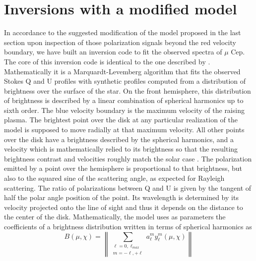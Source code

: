\documentclass{/Users/art2/TeX/aanda/aa}
\begin{document}
\section{Inversions with a modified model}

In accordance to the suggested modification of the model proposed in the last section upon inspection of those polarization signals beyond the red velocity boundary, we have built an inversion code to fit the observed spectra of $\mu$ Cep. The core of this inversion code is identical to the one described by \cite{LA18}. Mathematically it is a Marquardt-Levemberg algorithm that fits the observed Stokes Q and U profiles with synthetic profiles computed from a distribution of brightness over the surface of  the star. On the front hemisphere, this distribution of brightness is described by a linear combination of spherical harmonics up to sixth order. The blue velocity boundary is the maximum velocity of the raising plasma. The brightest point over the disk at any particular realization of the model is supposed to move radially at that maximum velocity. All other points over the disk have a brightness described by the spherical harmonics, and a velocity which is mathematically relied to its brightness so that the resulting brightness contrast and velocities roughly match the solar case \citep[see the Appendix in][]{LA22}. The polarization emitted by a point over the hemisphere is proportional to that brightness, but also to the squared sine of the scattering angle, as expected for Rayleigh scattering. The ratio of polarizations between Q and U is given by the tangent of half the polar angle position of the point. Its wavelength is determined by its velocity projected onto the line of sight and thus it depends on the distance to the center of the disk. Mathematically, the model uses as parameters  the coefficients of  a brightness distribution written in terms of spherical harmonics as
\begin{equation}
B(\mu,\chi)=\left \| \sum_{\substack{\ell=0,\ell_{max} \\ m=-\ell,+\ell}} a_{\ell}^m y_{\ell}^m(\mu,\chi) \right \|
\label{Beq}
\end{equation}
\end{document}
